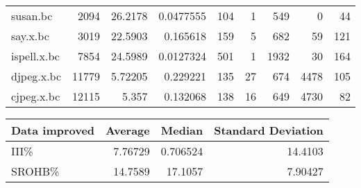 \begin{tabular}{lrrrrrrrr}
 susan.bc             &     2094 & 26.2178   &  0.0477555 &  104 &    1 &    549 &     0 &    44 \\
 say.x.bc             &     3019 & 22.5903   &  0.165618  &  159 &    5 &    682 &    59 &   121 \\
 ispell.x.bc          &     7854 & 24.5989   &  0.0127324 &  501 &    1 &   1932 &    30 &   164 \\
 djpeg.x.bc           &    11779 &  5.72205  &  0.229221  &  135 &   27 &    674 &  4478 &   105 \\
 cjpeg.x.bc           &    12115 &  5.357    &  0.132068  &  138 &   16 &    649 &  4730 &    82 \\
\hline
\end{tabular}\begin{tabular}{lrrr}
\hline
 Data improved   &   Average &    Median &   Standard Deviation \\
\hline
 III\%            &   7.76729 &  0.706524 &             14.4103  \\
 SROHB\%          &  14.7589  & 17.1057   &              7.90427 \\
\hline
\end{tabular}